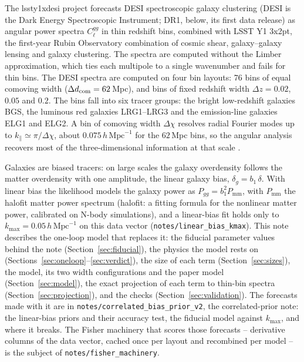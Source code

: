 \documentclass[11pt]{article}
\newcommand{\bone}{b_1}            %
\newcommand{\pnl}{P_{\mathrm{mm}}}
\newcommand{\kmax}{k_{\mathrm{max}}}
\newcommand{\hMpc}{\,h\,\mathrm{Mpc}^{-1}}
\begin{document}
The lssty1xdesi project forecasts DESI spectroscopic galaxy clustering
(DESI is the Dark Energy Spectroscopic Instrument; DR1, below, its
first data release) as angular power spectra $C_\ell^{gg}$ in thin
redshift bins, combined
with LSST Y1 3x2pt, the first-year Rubin Observatory combination of
cosmic shear, galaxy--galaxy lensing and galaxy clustering.  The
spectra are computed without the Limber approximation, which ties
each multipole to a single wavenumber and fails for thin bins.  The
DESI spectra are computed on four bin
layouts: 76 bins of equal comoving width
($\Delta d_{\rm com} = 62$\,Mpc), and bins of fixed redshift width
$\Delta z = 0.02$, $0.05$ and $0.2$.  The bins fall into six tracer
groups: the bright low-redshift galaxies BGS, the luminous red
galaxies LRG1--LRG3 and the emission-line galaxies ELG1 and ELG2.
A bin of comoving width
$\Delta\chi$ resolves radial Fourier modes up to
$k_\parallel \simeq \pi/\Delta\chi$, about $0.075\hMpc$ for the
$62$\,Mpc bins, so the angular analysis recovers most of the
three-dimensional information at that scale \cite{Asorey2012}.

Galaxies are biased tracers: on large scales the galaxy overdensity
follows the matter overdensity with one amplitude, the linear galaxy
bias, $\delta_g = \bone\,\delta$.  With linear bias the likelihood
models the galaxy power as
$P_{gg} = \bone^2\pnl$, with $\pnl$ the halofit matter power spectrum
(halofit: a fitting formula for the nonlinear matter power,
calibrated on N-body simulations),
and a linear-bias fit holds only to $\kmax = 0.05\hMpc$ on this data
vector (\texttt{notes/linear\_bias\_kmax}).  This note describes the
one-loop model that replaces it: the fiducial parameter values behind
the note (Section~\ref{sec:fiducial}), the physics the model rests on
(Sections~\ref{sec:oneloop}--\ref{sec:verdict}), the size of each term
(Section~\ref{sec:sizes}), the model, its two width configurations
and the paper model (Section~\ref{sec:model}), the exact
projection of each term to thin-bin spectra
(Section~\ref{sec:projection}), and the checks
(Section~\ref{sec:validation}).  The forecasts made with it are in
\texttt{notes/correlated\_bias\_prior\_v2}, the correlated-prior note:
the linear-bias priors and their accuracy test, the fiducial model
against
$\kmax$, and where it breaks.  The Fisher machinery that scores those
forecasts -- derivative columns of the data vector, cached once per
layout and recombined per model -- is the subject of
\texttt{notes/fisher\_machinery}.
\end{document}
